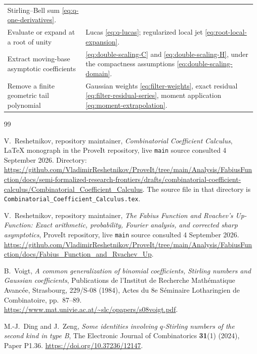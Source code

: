 \documentclass[11pt,a4paper]{article}
\numberwithin{equation}{section}
\theoremstyle{definition}
\theoremstyle{remark}
\begin{document}
\begin{longtable}{@{}>{\raggedright\arraybackslash}p{}>{\raggedright\arraybackslash}p{}@{}}
Stirling--Bell sum \eqref{eq:q-one-derivatives}.\\[3pt]
Evaluate or expand at a root of unity &
Lucas \eqref{eq:q-lucas}; regularized local jet
\eqref{eq:root-local-expansion}.\\[3pt]
Extract moving-base asymptotic coefficients &
\eqref{eq:double-scaling-C} and \eqref{eq:double-scaling-H}, under the
compactness assumptions \eqref{eq:double-scaling-domain}.\\[3pt]
Remove a finite geometric tail polynomial &
Gaussian weights \eqref{eq:filter-weights}, exact residual
\eqref{eq:filter-residual-series}, moment application
\eqref{eq:moment-extrapolation}.\\
\bottomrule
\end{longtable}

\clearpage
\begin{thebibliography}{99}
\raggedright
{}

V.~Reshetnikov, repository maintainer,
\emph{Combinatorial Coefficient Calculus},
LaTeX monograph in the ProveIt repository, live \texttt{main} source
consulted 4 September 2026.
Directory:\\
\url{https://github.com/VladimirReshetnikov/ProveIt/tree/main/Analysis/FabiusFunction/docs/semi-formalized-research-frontiers/drafts/combinatorial-coefficient-calculus/Combinatorial_Coefficient_Calculus}.
The source file in that directory is
\nolinkurl{Combinatorial_Coefficient_Calculus.tex}.

V.~Reshetnikov, repository maintainer,
\emph{The Fabius Function and Rvachev's Up-Function: Exact arithmetic,
probability, Fourier analysis, and corrected sharp asymptotics},
ProveIt repository, live \texttt{main} source consulted 4 September 2026.
\url{https://github.com/VladimirReshetnikov/ProveIt/tree/main/Analysis/FabiusFunction/docs/Fabius_Function_and_Rvachev_Up}.

B.~Voigt,
\emph{A common generalization of binomial coefficients, Stirling numbers
and Gaussian coefficients},
Publications de l'Institut de Recherche Math\'ematique Avanc\'ee,
Strasbourg, 229/S-08 (1984), Actes du 8e S\'eminaire Lotharingien de
Combinatoire, pp.~87--89.
\url{https://www.mat.univie.ac.at/~slc/opapers/s08voigt.pdf}.

M.-J.~Ding and J.~Zeng,
\emph{Some identities involving $q$-Stirling numbers of the second kind
in type B},
The Electronic Journal of Combinatorics \textbf{31}(1) (2024), Paper P1.36.
\url{https://doi.org/10.37236/12147}.


\end{thebibliography}
\end{document}
